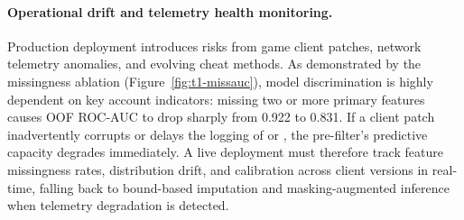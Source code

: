 \documentclass[../main.tex]{subfiles}
\begin{document}
\paragraph{Operational drift and telemetry health monitoring.} Production deployment introduces risks from game client patches, network telemetry anomalies, and evolving cheat methods. As demonstrated by the missingness ablation (Figure~\ref{fig:t1-missauc}), model discrimination is highly dependent on key account indicators: missing two or more primary features causes OOF ROC-AUC to drop sharply from 0.922 to 0.831. If a client patch inadvertently corrupts or delays the logging of  or , the pre-filter's predictive capacity degrades immediately. A live deployment must therefore track feature missingness rates, distribution drift, and calibration across client versions in real-time, falling back to bound-based imputation and masking-augmented inference when telemetry degradation is detected.

\endgroup
\end{document}
